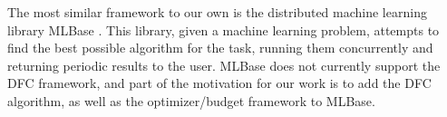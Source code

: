 The most similar framework to our own is the distributed machine learning library MLBase \cite{KTDGFJ13}. This library, given a machine learning problem, attempts to find the best possible algorithm for the task, running them concurrently and returning periodic results to the user. MLBase does not currently support the DFC framework, and part of the motivation for our work is to add the DFC algorithm, as well as the optimizer/budget framework to MLBase.